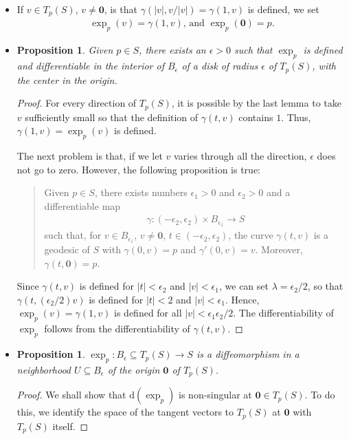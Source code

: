 \documentclass[10pt]{article}
\newtheorem{proposition}[lemma]{Proposition}
\newcommand{\dee}{\mathrm{d}}
\newcommand{\ve}[1]{\mathbf{#1}}
\newcommand{\ra}{\rightarrow}
\newcommand{\sseq}{\subseteq}
\begin{document}
\begin{itemize}
    \item If $v \in T_p(S)$, $v \neq \ve{0}$, is that $\gamma(|v|, v/|v|) = \gamma(1, v)$ is defined, we set
    \begin{align*}
      \exp_p(v) = \gamma(1, v)\mbox{, and } \exp_p(\ve{0}) = p.
    \end{align*}

    \item \begin{proposition}
      Given $p \in S$, there exists an $\epsilon > 0$ such that $\exp_p$ is defined and differentiable in the interior of $B_\epsilon$ of a disk of radius $\epsilon$ of $T_p(S)$, with the center in the origin.
    \end{proposition}

    \begin{proof}
      For every direction of $T_p(S)$, it is possible by the last lemma to take $v$ sufficiently small so that the definition of $\gamma(t,v)$ contains $1$. Thus, $\gamma(1,v) = \exp_p(v)$ is defined.

      The next problem is that, if we let $v$ varies through all the direction, $\epsilon$ does not go to zero. However, the following proposition is true:
      \begin{quote}
        Given $p \in S$, there exists numbers $\epsilon_1 > 0$ and $\epsilon_2 > 0$ and a differentiable map
        \begin{align*}
          \gamma: (-\epsilon_2, \epsilon_2) \times B_{\epsilon_1} \ra S
        \end{align*}
        such that, for $v \in B_{\epsilon_1}$, $v \neq \ve{0}$, $t \in (-\epsilon_2, \epsilon_2)$, the curve $\gamma(t,v)$ is a geodesic of $S$ with $\gamma(0, v) = p$ and $\gamma'(0,v) = v$. Moreover, $\gamma(t, \ve{0}) = p$.
      \end{quote}

      Since $\gamma(t, v)$ is defined for $|t| < \epsilon_2$ and $|v| < \epsilon_1$, we can set $\lambda = \epsilon_2/2$, so that $\gamma(t, (\epsilon_2/2)v)$ is defined for $|t| < 2$ and $|v| < \epsilon_1$. Hence, $\exp_p(v) = \gamma(1, v)$ is defined for all $|v| < \epsilon_1 \epsilon_2 / 2$. The differentiability of $\exp_p$ follows from the differentiability of $\gamma(t, v)$.
    \end{proof}

    \item \begin{proposition}
      $\exp_p: B_\epsilon \sseq T_p(S) \ra S$ is a diffeomorphism in a neighborhood $U \sseq B_\epsilon$ of the origin $\ve{0}$ of $T_p(S)$.
    \end{proposition}
    \begin{proof}
      We shall show that $\dee (\exp_p)$ is non-singular at $\ve{0} \in T_p(S)$. To do this, we identify the space of the tangent vectors to $T_p(S)$ at $\ve{0}$ with $T_p(S)$ itself.


\end{proof}
\end{itemize}
\end{document}
